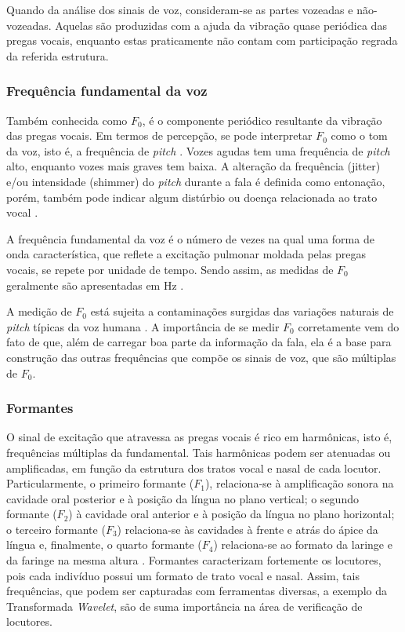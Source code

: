 			\par Quando da análise dos sinais de voz, consideram-se as partes vozeadas e não-vozeadas. Aquelas são produzidas com a ajuda da vibração quase periódica das pregas vocais, enquanto estas praticamente não contam com participação regrada da referida estrutura.
			
			\subsubsection{Frequência fundamental da voz}
				\par Também conhecida como $F_0$, é o componente periódico resultante da vibração das pregas vocais. Em termos de percepção, se pode interpretar $F_0$ como o tom da voz, isto é, a frequência de \textit{pitch} \cite{kremer2014eficiencia}. Vozes agudas tem uma frequência de \textit{pitch} alto, enquanto vozes mais graves tem baixa. A alteração da frequência (jitter) e/ou intensidade (shimmer) do \textit{pitch} durante a fala é definida como entonação,  porém, também pode indicar algum distúrbio ou doença relacionada ao trato vocal \cite{WERTZNER2005}.
				
				\par A frequência fundamental da voz é o número de vezes na qual uma forma de onda característica, que reflete a excitação pulmonar moldada pelas pregas vocais, se repete por unidade de tempo. Sendo assim, as medidas de $F_0$ geralmente são apresentadas em Hz \cite{freitas2013avaliaccao}.
			
				\par A medição de $F_0$ está sujeita a contaminações surgidas das variações naturais de \textit{pitch} típicas da voz humana \cite{freitas2013avaliaccao}. A importância de se medir $F_0$ corretamente vem do fato de que, além de carregar boa parte da informação da fala, ela é a base para construção das outras frequências que compõe os sinais de voz, que são múltiplas de $F_0$.
				
				\subsubsection{Formantes}
					\par O sinal de excitação que atravessa as pregas vocais é rico em harmônicas, isto é, frequências múltiplas da fundamental. Tais harmônicas podem ser atenuadas ou amplificadas, em função da estrutura dos tratos vocal e nasal de cada locutor. Particularmente, o primeiro formante ($F_1$), relaciona-se à  amplificação  sonora  na  cavidade  oral  posterior  e  à  posição  da  língua  no  plano  vertical;  o segundo  formante  ($F_2$)  à  cavidade  oral  anterior  e  à  posição  da  língua  no  plano  horizontal; o terceiro  formante  ($F_3$)  relaciona-se  às  cavidades  à  frente  e  atrás  do  ápice  da  língua e, finalmente,  o  quarto formante  ($F_4$) relaciona-se  ao  formato  da  laringe  e  da  faringe  na  mesma  altura  \cite{valencca2014analise}. Formantes caracterizam fortemente os locutores, pois cada indivíduo possui um formato de trato vocal e nasal. Assim, tais frequências, que podem ser capturadas com ferramentas diversas, a exemplo da Transformada \textit{Wavelet}, são de suma importância na área de verificação de locutores.


